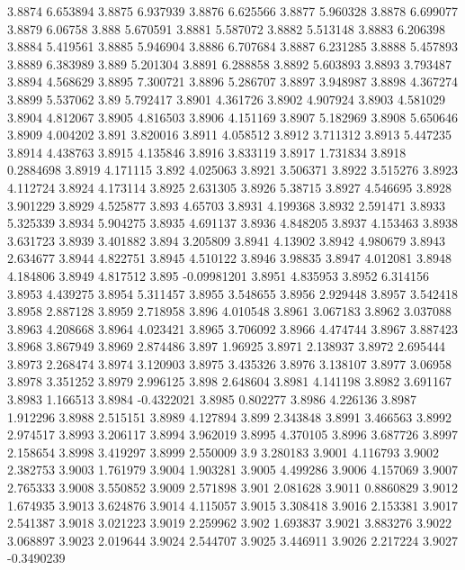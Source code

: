 3.8874  6.653894
3.8875  6.937939
3.8876  6.625566
3.8877  5.960328
3.8878  6.699077
3.8879  6.06758
3.888  5.670591
3.8881  5.587072
3.8882  5.513148
3.8883  6.206398
3.8884  5.419561
3.8885  5.946904
3.8886  6.707684
3.8887  6.231285
3.8888  5.457893
3.8889  6.383989
3.889  5.201304
3.8891  6.288858
3.8892  5.603893
3.8893  3.793487
3.8894  4.568629
3.8895  7.300721
3.8896  5.286707
3.8897  3.948987
3.8898  4.367274
3.8899  5.537062
3.89  5.792417
3.8901  4.361726
3.8902  4.907924
3.8903  4.581029
3.8904  4.812067
3.8905  4.816503
3.8906  4.151169
3.8907  5.182969
3.8908  5.650646
3.8909  4.004202
3.891  3.820016
3.8911  4.058512
3.8912  3.711312
3.8913  5.447235
3.8914  4.438763
3.8915  4.135846
3.8916  3.833119
3.8917  1.731834
3.8918  0.2884698
3.8919  4.171115
3.892  4.025063
3.8921  3.506371
3.8922  3.515276
3.8923  4.112724
3.8924  4.173114
3.8925  2.631305
3.8926  5.38715
3.8927  4.546695
3.8928  3.901229
3.8929  4.525877
3.893  4.65703
3.8931  4.199368
3.8932  2.591471
3.8933  5.325339
3.8934  5.904275
3.8935  4.691137
3.8936  4.848205
3.8937  4.153463
3.8938  3.631723
3.8939  3.401882
3.894  3.205809
3.8941  4.13902
3.8942  4.980679
3.8943  2.634677
3.8944  4.822751
3.8945  4.510122
3.8946  3.98835
3.8947  4.012081
3.8948  4.184806
3.8949  4.817512
3.895  -0.09981201
3.8951  4.835953
3.8952  6.314156
3.8953  4.439275
3.8954  5.311457
3.8955  3.548655
3.8956  2.929448
3.8957  3.542418
3.8958  2.887128
3.8959  2.718958
3.896  4.010548
3.8961  3.067183
3.8962  3.037088
3.8963  4.208668
3.8964  4.023421
3.8965  3.706092
3.8966  4.474744
3.8967  3.887423
3.8968  3.867949
3.8969  2.874486
3.897  1.96925
3.8971  2.138937
3.8972  2.695444
3.8973  2.268474
3.8974  3.120903
3.8975  3.435326
3.8976  3.138107
3.8977  3.06958
3.8978  3.351252
3.8979  2.996125
3.898  2.648604
3.8981  4.141198
3.8982  3.691167
3.8983  1.166513
3.8984  -0.4322021
3.8985  0.802277
3.8986  4.226136
3.8987  1.912296
3.8988  2.515151
3.8989  4.127894
3.899  2.343848
3.8991  3.466563
3.8992  2.974517
3.8993  3.206117
3.8994  3.962019
3.8995  4.370105
3.8996  3.687726
3.8997  2.158654
3.8998  3.419297
3.8999  2.550009
3.9  3.280183
3.9001  4.116793
3.9002  2.382753
3.9003  1.761979
3.9004  1.903281
3.9005  4.499286
3.9006  4.157069
3.9007  2.765333
3.9008  3.550852
3.9009  2.571898
3.901  2.081628
3.9011  0.8860829
3.9012  1.674935
3.9013  3.624876
3.9014  4.115057
3.9015  3.308418
3.9016  2.153381
3.9017  2.541387
3.9018  3.021223
3.9019  2.259962
3.902  1.693837
3.9021  3.883276
3.9022  3.068897
3.9023  2.019644
3.9024  2.544707
3.9025  3.446911
3.9026  2.217224
3.9027  -0.3490239
